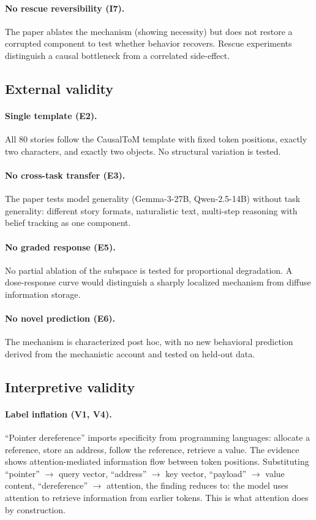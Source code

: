 \documentclass[11pt]{article}
\begin{document}
\paragraph{No rescue reversibility (I7).}
The paper ablates the mechanism (showing necessity) but does not restore a corrupted component to test whether behavior recovers. Rescue experiments distinguish a causal bottleneck from a correlated side-effect.

\subsection{External validity}

\paragraph{Single template (E2).}
All 80 stories follow the CausalToM template with fixed token positions, exactly two characters, and exactly two objects. No structural variation is tested.

\paragraph{No cross-task transfer (E3).}
The paper tests model generality (Gemma-3-27B, Qwen-2.5-14B) without task generality: different story formats, naturalistic text, multi-step reasoning with belief tracking as one component.

\paragraph{No graded response (E5).}
No partial ablation of the subspace is tested for proportional degradation. A dose-response curve would distinguish a sharply localized mechanism from diffuse information storage.

\paragraph{No novel prediction (E6).}
The mechanism is characterized post hoc, with no new behavioral prediction derived from the mechanistic account and tested on held-out data.

\subsection{Interpretive validity}

\paragraph{Label inflation (V1, V4).}
``Pointer dereference'' imports specificity from programming languages: allocate a reference, store an address, follow the reference, retrieve a value. The evidence shows attention-mediated information flow between token positions. Substituting ``pointer'' $\rightarrow$ query vector, ``address'' $\rightarrow$ key vector, ``payload'' $\rightarrow$ value content, ``dereference'' $\rightarrow$ attention, the finding reduces to: the model uses attention to retrieve information from earlier tokens. This is what attention does by construction.
\end{document}
